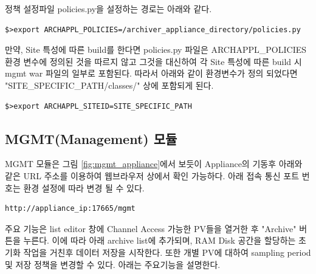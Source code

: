 \documentclass[11pt
  , a4paper
  , article
  , oneside
]{memoir}
\begin{document}
정책 설정파일 policies.py을 설정하는 경로는 아래와 같다.
\begin{lstlisting}[style=termstyle]
$>export ARCHAPPL_POLICIES=/archiver_appliance_directory/policies.py
\end{lstlisting}

만약, Site 특성에 따른 build를 한다면 policies.py 파일은 ARCHAPPL\_POLICIES 환경 변수에 정의된 것을 따르지 않고 그것을 대신하여 각 Site 특성에 따른 build 시 mgmt war 파일의 일부로 포함된다. 따라서 아래와 같이 환경변수가 정의 되었다면 "SITE\_SPECIFIC\_PATH/classes/" 상에 포함되게 된다.
\begin{lstlisting}[style=termstyle]
$>export ARCHAPPL_SITEID=SITE_SPECIFIC_PATH
\end{lstlisting}

\subsection*{MGMT(Management) 모듈}
MGMT 모듈은 그림 \ref{fig:mgmt_appliance}에서 보듯이 Appliance의 기동후 아래와 같은 URL 주소를 이용하여 웹브라우저 상에서 확인 가능하다. 아래 접속 통신 포트 번호는 환경 설정에 따라 변경 될 수 있다.
\begin{lstlisting}[style=termstyle]
http://appliance_ip:17665/mgmt
\end{lstlisting}
주요 기능은 list editor 창에 Channel Access 가능한 PV들을 열거한 후 "Archive" 버튼을 누른다. 이에 따라 아래 archive list에 추가되며, RAM Disk 공간을 할당하는 초기화 작업을 거친후 데이터 저장을 시작한다. 또한 개별 PV에 대하여 sampling period 및 저장 정책을 변경할 수 있다. 아래는 주요기능을 설명한다.
\end{document}
